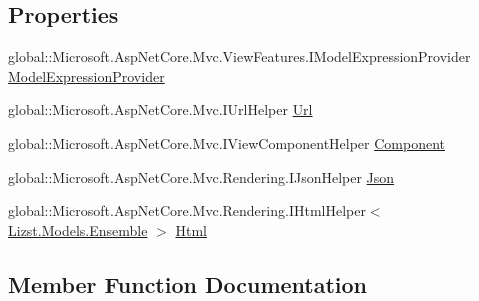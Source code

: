 \subsection*{Properties}
\begin{DoxyCompactItemize}
\item 
global\+::\+Microsoft.\+Asp\+Net\+Core.\+Mvc.\+View\+Features.\+I\+Model\+Expression\+Provider \mbox{\hyperlink{class_asp_net_core_1_1_views___ensemble___edit_ensemble_a5fb225d070edd301a7095dcde4b1ef70}{Model\+Expression\+Provider}}
\item 
global\+::\+Microsoft.\+Asp\+Net\+Core.\+Mvc.\+I\+Url\+Helper \mbox{\hyperlink{class_asp_net_core_1_1_views___ensemble___edit_ensemble_a7eb0f6013f766e8a1fd00af4fdf3d0d4}{Url}}
\item 
global\+::\+Microsoft.\+Asp\+Net\+Core.\+Mvc.\+I\+View\+Component\+Helper \mbox{\hyperlink{class_asp_net_core_1_1_views___ensemble___edit_ensemble_a25a527d2774107f622d3df2ecb2257aa}{Component}}
\item 
global\+::\+Microsoft.\+Asp\+Net\+Core.\+Mvc.\+Rendering.\+I\+Json\+Helper \mbox{\hyperlink{class_asp_net_core_1_1_views___ensemble___edit_ensemble_aaa2ac10a30842049ba4330486db57c0b}{Json}}
\item 
global\+::\+Microsoft.\+Asp\+Net\+Core.\+Mvc.\+Rendering.\+I\+Html\+Helper$<$ \mbox{\hyperlink{class_lizst_1_1_models_1_1_ensemble}{Lizst.\+Models.\+Ensemble}} $>$ \mbox{\hyperlink{class_asp_net_core_1_1_views___ensemble___edit_ensemble_aefe07dd49af5fd1354c8ca961c81178f}{Html}}
\end{DoxyCompactItemize}


\subsection{Member Function Documentation}
\mbox{\label{class_asp_net_core_1_1_views___ensemble___edit_ensemble_ae3ace6f7a83a5e6395bc9e8e2d18c70f}} 
